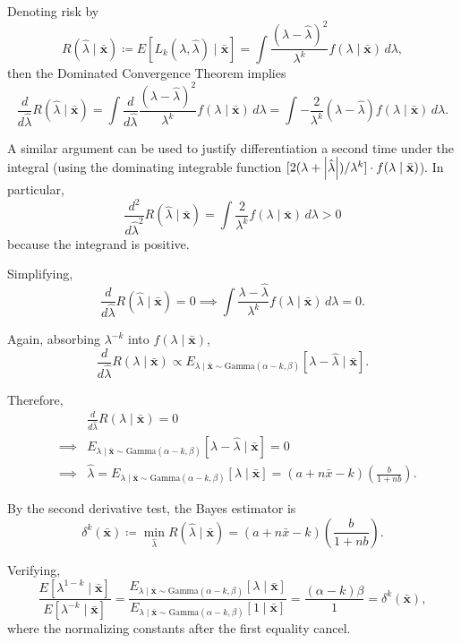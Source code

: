 \begin{solution}
  Denoting risk by
  \[
    R(\hat{\lambda} \mid \bar{\mathbf{x}}) \coloneqq  E[L_k(\lambda, \hat{\lambda}) \mid \bar{\mathbf{x}}] = \int \frac{(\lambda - \hat{\lambda})^2}{\lambda^{k}} f(\lambda \mid \bar{\mathbf{x}})\, d\lambda,
  \]
  then the Dominated Convergence Theorem implies
  \[
    \frac{d}{d \hat{\lambda}} R(\hat{\lambda} \mid \bar{\mathbf{x}}) = \int \frac{d}{d \hat{\lambda}} \frac{(\lambda - \hat{\lambda})^2}{\lambda^{k}} f(\lambda \mid \bar{\mathbf{x}})\,d \lambda = \int -\frac{2}{\lambda^{k}}(\lambda - \hat{\lambda}) f(\lambda \mid \bar{\mathbf{x}})\, d \lambda.
  \]

  A similar argument can be used to justify differentiation a second time under the integral (using the dominating integrable function \( [2(\lambda + \left\lvert\hat{\lambda}\right\rvert) / {\lambda^{k}}] \cdot f(\lambda \mid \bar{\mathbf{x}}) \)). In particular,
  \[
    \frac{d^2}{d \hat{\lambda}^2} R(\hat{\lambda} \mid \bar{\mathbf{x}}) = \int \frac{2}{\lambda^{k}} f(\lambda \mid \bar{\mathbf{x}})\, d \lambda > 0
  \]
  because the integrand is positive.

  Simplifying,
  \[
    \frac{d}{d \hat{\lambda}} R(\hat{\lambda} \mid \bar{\mathbf{x}}) = 0 \implies \int \frac{\lambda - \hat{\lambda}}{\lambda^{k}} f(\lambda \mid \bar{\mathbf{x}})\, d \lambda = 0.
  \]

  Again, absorbing \( \lambda^{-k} \) into \( f(\lambda \mid \bar{\mathbf{x}}) \),
  \[
    \frac{d}{d \hat{\lambda}}R(\lambda \mid \bar{\mathbf{x}}) \propto E_{\lambda \mid \bar{\mathbf{x}} \sim \mathrm{Gamma}(\alpha -k, \beta)}[\lambda - \hat{\lambda} \mid \bar{\mathbf{x}}].
  \]

  Therefore,
  \[
    \begin{aligned}
       &          & \frac{d}{d \hat{\lambda}}R(\lambda \mid \bar{\mathbf{x}}) = 0                                                                                                              \\
       & \implies & E_{\lambda \mid \bar{\mathbf{x}} \sim \mathrm{Gamma}(\alpha -k, \beta)}[\lambda - \hat{\lambda} \mid \bar{\mathbf{x}}] = 0                                                 \\
       & \implies & \hat{\lambda} = E_{\lambda \mid \bar{\mathbf{x}} \sim \mathrm{Gamma}(\alpha -k, \beta)}[\lambda \mid \bar{\mathbf{x}}] = (a + n\bar{x} - k) \left( \frac{b}{1+nb} \right).
    \end{aligned}
  \]

  By the second derivative test, the Bayes estimator is
  \[
    \delta^{k}(\bar{\mathbf{x}}) \coloneqq \min_{\hat{\lambda}} R(\hat{\lambda} \mid \bar{\mathbf{x}}) = (a + n\bar{x} - k) \left( \frac{b}{1+nb} \right).
  \]

  Verifying,
  \[
    \frac{E[\lambda^{1-k} \mid \bar{\mathbf{x}}]}{E[\lambda^{-k} \mid \bar{\mathbf{x}}]} = \frac{E_{\lambda \mid \bar{\mathbf{x}} \sim \mathrm{Gamma}(\alpha -k, \beta)}[\lambda \mid \bar{\mathbf{x}}]}{E_{\lambda \mid \bar{\mathbf{x}} \sim \mathrm{Gamma}(\alpha -k, \beta)}[1 \mid \bar{\mathbf{x}}]} = \frac{(\alpha - k)\beta}{1} = \delta^{k}(\bar{\mathbf{x}}),
  \]
  where the normalizing constants after the first equality cancel.
\end{solution}